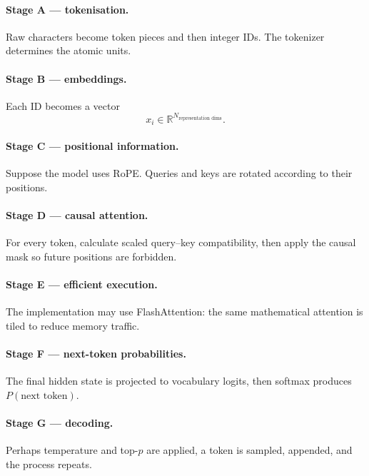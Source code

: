 \paragraph{Stage A --- tokenisation.}
Raw characters become token pieces and then integer IDs.
The tokenizer determines the atomic units.

\paragraph{Stage B --- embeddings.}
Each ID becomes a vector
\[
x_i\in\mathbb R^{N_{\text{representation dims}}}.
\]

\paragraph{Stage C --- positional information.}
Suppose the model uses RoPE.
Queries and keys are rotated according to their positions.

\paragraph{Stage D --- causal attention.}
For every token, calculate scaled query--key compatibility, then apply the causal mask so future positions are forbidden.

\paragraph{Stage E --- efficient execution.}
The implementation may use FlashAttention: the same mathematical attention is tiled to reduce memory traffic.

\paragraph{Stage F --- next-token probabilities.}
The final hidden state is projected to vocabulary logits, then softmax produces $P(\text{next token})$.

\paragraph{Stage G --- decoding.}
Perhaps temperature and top-$p$ are applied, a token is sampled, appended, and the process repeats.

